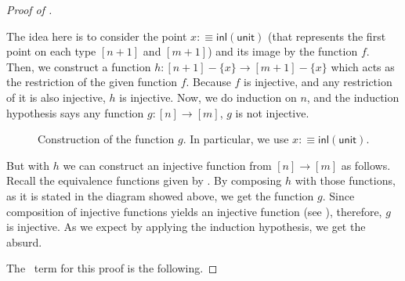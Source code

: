 \documentclass[11pt, a4paper, oneside]{amsart}
\begin{document}
\begin{proof}[Proof of ]\label{proof-pigeon-theorem}

The idea here is to consider the point $x :\equiv \mathsf{inl}
(\mathsf{unit})$ (that represents the first point on each type $[n+1]$
and $[m+1]$) and its image by the function $f$. Then, we construct a
function $h : [n + 1] - \{x\} \to [ m + 1 ] - \{ x\}$ which acts as
the restriction of the given function $f$. Because $f$ is injective,
and any restriction of it is also injective, $h$ is injective. Now, we
do induction on $n$, and the induction hypothesis says any function $g
: [n] → [m]$, $g$ is not injective.

\begin{figure}[!ht]
\begin{center}
\end{center}
\caption{Construction of the function $g$. In particular, we use $x :\equiv \mathsf{inl}(\mathsf{unit})$. }
\label{diagram}
\end{figure}

But with $h$ we can construct an injective function from $[n] \to [m]$
as follows. Recall the equivalence functions given by
. By composing $h$ with those functions, as it is
stated in the diagram showed above, we get the function $g$. Since
composition of injective functions yields an injective function (see
), therefore, $g$ is injective. As
we expect by applying the induction hypothesis, we get the absurd.

The \Agda\ term for this proof is the following.


\end{proof}
\end{document}
